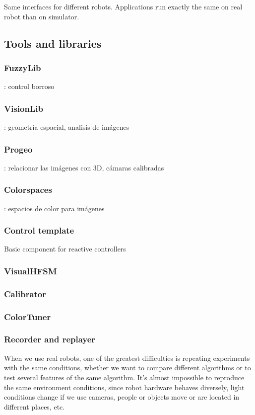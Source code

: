\documentclass[twocolumn]{svjour3}          %
\begin{document}
Same interfaces for different robots.
Applications run exactly the same on real robot than on simulator. 

\subsection{Tools and libraries}

\subsubsection{FuzzyLib}: control borroso
\subsubsection{VisionLib}: geometría espacial, analisis de imágenes 
\subsubsection{Progeo}: relacionar las imágenes con 3D, cámaras calibradas 
\subsubsection{Colorspaces}: espacios de color para imágenes

\subsubsection{Control template}
Basic component for reactive controllers
\subsubsection{VisualHFSM}
\subsubsection{Calibrator}
\subsubsection{ColorTuner}
\subsubsection{Recorder and replayer}

When we use real robots, one of the greatest difficulties is repeating experiments with the same conditions, whether we want to compare different algorithms or to test several features of the same algorithm. It's almost impossible to reproduce the same environment conditions, since robot hardware behaves diversely, light conditions change if we use cameras, people or objects move or are located in different places, etc.
\end{document}
